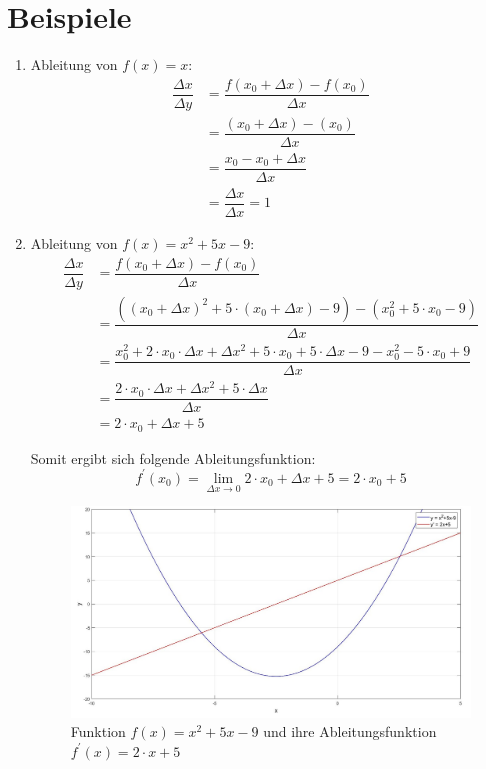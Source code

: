 \documentclass[11pt, a4paper]{report}
\begin{document}
\section*{Beispiele}
\begin{enumerate}
\item Ableitung von $f(x) = x$:
\begin{align*}
\dfrac{\Delta x}{\Delta y} &= \dfrac{f(x_0+\Delta x)-f(x_0)}{\Delta x}\\
&=\dfrac{(x_0+\Delta x)-(x_0)}{\Delta x}\\
&=\dfrac{x_0-x_0+\Delta x}{\Delta x}\\
&=\dfrac{\Delta x}{\Delta x} = 1
\end{align*}
\clearpage

\item Ableitung von $f(x) = x^2+5x-9$:
\begin{align*}
\dfrac{\Delta x}{\Delta y} &= \dfrac{f(x_0+\Delta x)-f(x_0)}{\Delta x}\\
&=\dfrac{((x_0+\Delta x)^{2}+5\cdot(x_0+\Delta x)-9)-(x_0^{2}+5\cdot x_0-9)}{\Delta x}\\
&=\dfrac{x_0^{2}+2\cdot x_0 \cdot \Delta x+\Delta x^{2}+5\cdot x_0+5\cdot \Delta x-9-x_0^{2}-5\cdot x_0+9}{\Delta x}\\
&=\dfrac{2\cdot x_0\cdot \Delta x + \Delta x^{2}+5\cdot \Delta x}{\Delta x}\\
&=2\cdot x_0+\Delta x+5
\end{align*} %

Somit ergibt sich folgende Ableitungsfunktion:
\begin{equation}
f^{\prime}(x_0)= \lim\limits_{\Delta x \to 0}{2\cdot x_0+\Delta x+5} = 2\cdot x_0+5
\end{equation}

\begin{center}
\begin{figure}[h]
\includegraphics[scale=0.3]{fig/Ableitung_Differenzenquotient_Nr2}
\caption[Funktion $f(x) = x^2+5x-9$ und ihre Ableitungsfunktion]{Funktion $f(x) = x^2+5x-9$ und ihre Ableitungsfunktion $f^{\prime}(x)= 2\cdot x+5$}
\label{fig:AbleitungDifferenzenquo1}
\end{figure}
\end{center}


\end{enumerate}
\end{document}
